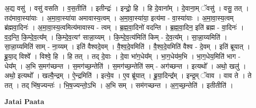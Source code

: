 \documentclass[17pt]{extarticle}
\begin{document}
अ॒द्य वसु॑ । वसु॑ वसति । व॒स॒तीति॑ । इतीन्द्रः॑ । इन्द्रो॒ हि । हि दे॒वाना᳚म् । दे॒वाना॒म् ॅवसु॑ । वसु॒ तत् । तद॑मावा॒स्या॑याः । अ॒मा॒वा॒स्या॑या अमावास्य॒त्वम् । अ॒मा॒वा॒स्या॑या॒ इत्य॑मा - वा॒स्या॑याः । अ॒मा॒वा॒स्य॒त्वम् ब्र॑ह्मवा॒दिनः॑ । अ॒मा॒वा॒स्य॒त्वमित्य॑मावास्य - त्वम् । ब्र॒ह्म॒वा॒दिनो॑ वदन्ति । ब्र॒ह्म॒वा॒दिन॒ इति॑ ब्रह्म - वा॒दिनः॑ । व॒द॒न्ति॒ कि॒म्दे॒व॒त्य᳚म् । कि॒म्दे॒व॒त्यꣳ॑ सान्ना॒य्यम् । कि॒म्दे॒व॒त्य॑मिति॑ किम् - दे॒व॒त्य᳚म् । सा॒न्ना॒य्यमिति॑ । सा॒न्ना॒य्यमिति॑ साम् - ना॒य्यम् । इति॑ वैश्वदे॒वम् । वै॒श्व॒दे॒वमिति॑ । वै॒श्व॒दे॒वमिति॑ वैश्व - दे॒वम् । इति॑ ब्रूयात् । ब्रू॒या॒द् विश्वे᳚ । विश्वे॒ हि । हि तत् । तद् दे॒वाः । दे॒वा भा॑ग॒धेय᳚म् । भा॒ग॒धेय॑म॒भि । भा॒ग॒धेय॒मिति॑ भाग - धेय᳚म् । अ॒भि स॒मग॑च्छन्त । स॒मग॑च्छ॒न्तेति॑ । स॒मग॑च्छ॒न्तेति॑ सम् - अग॑च्छन्त । इत्यथो᳚ । अथो॒ खलु॑ । अथो॒ इत्यथो᳚ । खल्वै॒न्द्रम् । ऐ॒न्द्रमिति॑ । इत्ये॒व । ए॒व ब्रू॑यात् । ब्रू॒या॒दिन्द्र᳚म् । इन्द्र॒म् ॅवाव । वाव ते । ते तत् । तद् भि॑ष॒ज्यन्तः॑ । भि॒ष॒ज्यन्तो॒ऽभि । अ॒भि सम् । सम॑गच्छन्त । अ॒ग॒च्छ॒न्तेति॑ । इतीतीति॑ । \newline

\textbf{Jatai Paata} \newline
\end{document}
